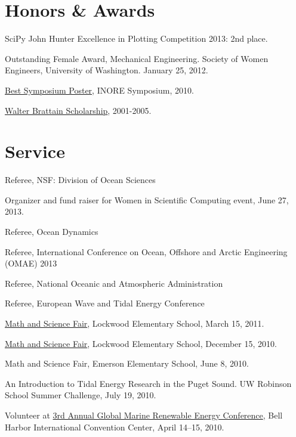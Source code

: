 \documentclass[10pt,letterpaper]{article}
\renewenvironment{itemize}{
  \begin{list}{}{
    \setlength{\leftmargin}{1.5em}
    \setlength{\itemsep}{0.25em}
    \setlength{\parskip}{0pt}
    \setlength{\parsep}{0.25em}
  }
}{
  \end{list}
}
\begin{document}
\section*{Honors \& Awards}

\begin{itemize}

\item SciPy John Hunter Excellence in Plotting Competition 2013: 2nd place.

\item Outstanding Female Award, Mechanical Engineering. Society of Women Engineers, University of Washington. January 25, 2012.

\item \href{http://www.inore.org}{Best Symposium Poster}, INORE Symposium, 2010.

\item \href{https://www.whitman.edu/content/catalog/financial-aid}{Walter Brattain Scholarship}, 2001-2005.

%

\end{itemize}

\section*{Service}
\begin{itemize}
  \item Referee, NSF: Division of Ocean Sciences
  \item Organizer and fund raiser for Women in Scientific Computing event, June 27, 2013.
  \item Referee, Ocean Dynamics
  \item Referee, International Conference on Ocean, Offshore and Arctic Engineering (OMAE) 2013
	\item Referee, National Oceanic and Atmospheric Administration
	\item Referee, European Wave and Tidal Energy Conference
	\item \href{http://www.amath.washington.edu/~siamuw/math-fair.html}{Math and Science Fair}, Lockwood Elementary School, March 15, 2011.
	\item \href{http://www.amath.washington.edu/~siamuw/math-fair.html}{Math and Science Fair}, Lockwood Elementary School, December 15, 2010.
	\item Math and Science Fair, Emerson Elementary School, June 8, 2010.
	\item An Introduction to Tidal Energy Research in the Puget Sound. UW Robinson School Summer Challenge, July 19, 2010.
	\item Volunteer at \href{http://www.globalmarinerenewable.com/}{3rd Annual Global Marine Renewable Energy Conference},  Bell Harbor International Convention Center,  April 14--15, 2010.
\end{itemize}
\end{document}
